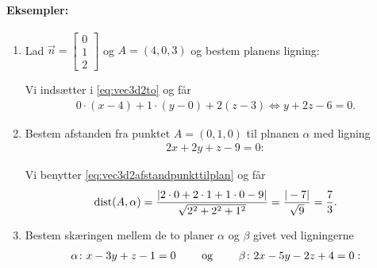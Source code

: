 \paragraph*{Eksempler:}
\begin{enumerate}
\item Lad $\vec{n}=\begin{bmatrix}0 \\ 1 \\ 2\end{bmatrix}$ og $A=(4,0,3)$ og bestem planens ligning:

Vi indsætter i \eqref{eq:vec3d2to} og får
\begin{align*}
0 \cdot (x - 4) + 1 \cdot (y-0)  + 2(z-3) \Leftrightarrow y + 2z - 6 = 0.
\end{align*}
\item Bestem afstanden fra punktet $A=(0,1,0)$ til plnanen $\alpha$ med ligning
\begin{align*}
2x+2y+z-9=0:
\end{align*}

Vi benytter \eqref{eq:vec3d2afstandpunkttilplan} og får 
\begin{align*}
\mathrm{dist}(A,\alpha)=\frac{\vert 2 \cdot 0 + 2 \cdot 1 + 1 \cdot 0 - 9\vert}{\sqrt{2^2+2^2+1^2}}=\frac{\vert -7\vert}{\sqrt{9}} = \frac{7}{3}.
\end{align*}
\item Bestem skæringen mellem de to planer $\alpha$ og $\beta$ givet ved ligningerne
\begin{align*}
\alpha \colon x-3y+z-1 = 0 \qquad \textup{ og } \qquad \beta \colon 2x-5y-2z+4 = 0:
\end{align*}


\end{enumerate}
